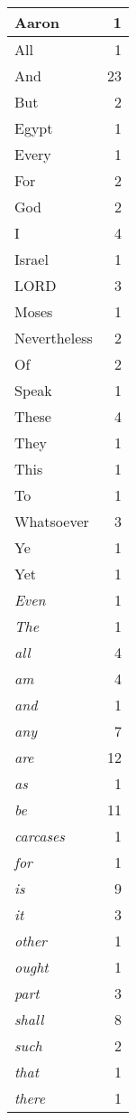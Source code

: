 \begin{center}
\begin{longtable}{l|r}
\hline \hline
\endlastfoot
Aaron & 1 \\ \hline
All & 1 \\ \hline
And & 23 \\ \hline
But & 2 \\ \hline
Egypt & 1 \\ \hline
Every & 1 \\ \hline
For & 2 \\ \hline
God & 2 \\ \hline
I & 4 \\ \hline
Israel & 1 \\ \hline
LORD & 3 \\ \hline
Moses & 1 \\ \hline
Nevertheless & 2 \\ \hline
Of & 2 \\ \hline
Speak & 1 \\ \hline
These & 4 \\ \hline
They & 1 \\ \hline
This & 1 \\ \hline
To & 1 \\ \hline
Whatsoever & 3 \\ \hline
Ye & 1 \\ \hline
Yet & 1 \\ \hline
\emph{Even} & 1 \\ \hline
\emph{The} & 1 \\ \hline
\emph{all} & 4 \\ \hline
\emph{am} & 4 \\ \hline
\emph{and} & 1 \\ \hline
\emph{any} & 7 \\ \hline
\emph{are} & 12 \\ \hline
\emph{as} & 1 \\ \hline
\emph{be} & 11 \\ \hline
\emph{carcases} & 1 \\ \hline
\emph{for} & 1 \\ \hline
\emph{is} & 9 \\ \hline
\emph{it} & 3 \\ \hline
\emph{other} & 1 \\ \hline
\emph{ought} & 1 \\ \hline
\emph{part} & 3 \\ \hline
\emph{shall} & 8 \\ \hline
\emph{such} & 2 \\ \hline
\emph{that} & 1 \\ \hline
\emph{there} & 1 \\ \hline

\end{longtable}
\end{center}
